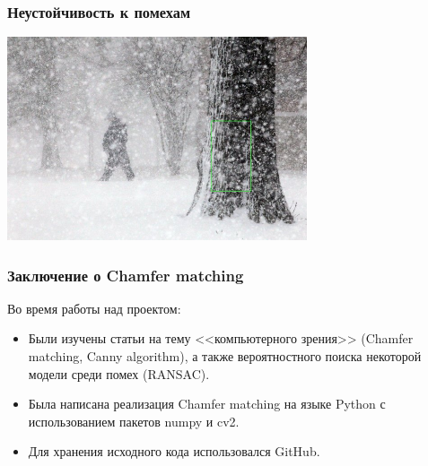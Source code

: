 \begin{frame}\frametitle{Неустойчивость к помехам}
    \begin{center}
        \includegraphics[height=6cm]{veselov_imgs/occurrence2.jpg}
    \end{center}
\end{frame}

\begin{frame}\frametitle{Заключение о Chamfer matching}
    Во время работы над проектом:
    \begin{itemize}
        \item Были изучены статьи на тему
        <<компьютерного зрения>> (Chamfer matching, Canny algorithm), а также
        вероятностного поиска некоторой модели среди помех (RANSAC).
        
        \item Была написана реализация Chamfer matching на языке Python с
        использованием пакетов numpy и cv2.
        
        \item Для хранения исходного кода использовался GitHub.
    \end{itemize}
\end{frame}
